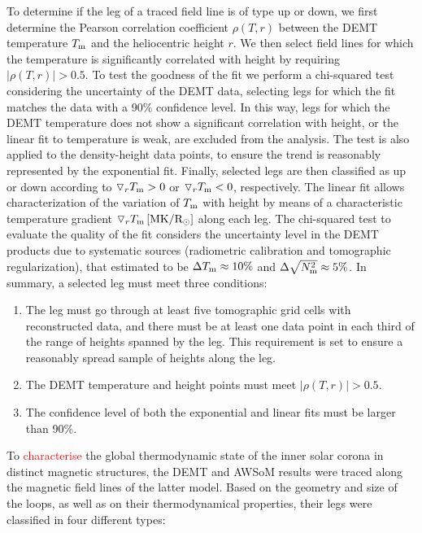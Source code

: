\documentclass[namedreferences]{solarphysics}
\def\edit#1{\textcolor{Red}{#1}}
\newcommand{\mrsun}{{\rm R_\odot}}
\newcommand{\MK}{{\rm MK}}
\newcommand{\dr}{\triangledown_r}
\newcommand{\Tm}{T_{\rm m}}
\newcommand{\Nsqm}{N^2_{{\rm m}}}
\newcommand{\rhoTr}{\rho(T,r)}
\newcommand{\sqravgN}{\sqrt{\Nsqm}}
\begin{document}
\begin{article}
{To determine if the leg of a traced field line is} of type up or down, we first determine the Pearson correlation coefficient $\rhoTr$ between the DEMT temperature $\Tm$ and the heliocentric height $r$. We then select field lines for which the temperature {is significantly correlated with height} by requiring $|\rhoTr| > 0.5$. {To test the goodness of the fit we perform a chi-squared test \citep{recipes} considering the uncertainty of the DEMT data, selecting legs for which the fit matches the data with a 90\% confidence level.} In this way, legs for which the DEMT temperature does not show a significant {correlation} with height, or the linear fit to temperature is {weak}, are {excluded from the} analysis. {The test is also applied to the density-height data points, to ensure the trend is reasonably represented by the exponential fit.} Finally, selected legs are then classified as up or down according to $\dr\Tm > 0$ or $\dr\Tm < 0$, respectively. The linear fit allows characterization of the variation of $\Tm$ with height by means of a characteristic temperature gradient $\dr \Tm\,[\MK/\mrsun]$ along each leg. {The chi-squared test to evaluate the quality of the {fit} considers the uncertainty level in the DEMT products due to systematic sources (radiometric calibration and tomographic regularization), that \citet{lloveras_2017} estimated to be $\Delta\Tm\approx 10\%$ and $\Delta\sqravgN\approx 5\%$.} In summary, {a selected leg must meet three conditions:}

\begin{enumerate}
\item 
The leg must go through at least five tomographic grid cells with reconstructed data, and there must be at least one data point in each third of the range of heights spanned by the leg. {This requirement is set to ensure a reasonably spread sample of heights along the leg.}
\item 
The {DEMT temperature and height points must meet} $|\rhoTr| > 0.5$.
\item 
{The confidence level of both the exponential and linear fits must be larger than 90\%.} 
\end{enumerate}

{To \edit{characterise} the global thermodynamic state of the inner solar corona in distinct magnetic structures, the DEMT and AWSoM results were traced along the magnetic field lines of the latter model. Based on the geometry and size of the loops, as well as on their thermodynamical properties, their legs were classified in four different types:} 


\end{article}
\end{document}

